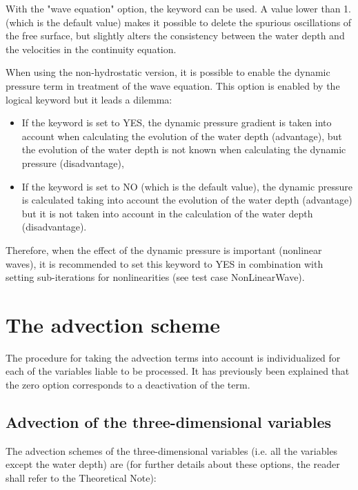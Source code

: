 With the "wave equation" option, the keyword  can be used. A value lower than 1. (which is the default value) makes
it possible to delete the spurious oscillations of the free surface, but
slightly alters the consistency between the water depth and the velocities in
the continuity equation.

When using the non-hydrostatic version, it is possible to enable the dynamic
pressure term in treatment of the wave equation. This option is enabled by the
logical keyword  but it leads a
dilemma:

\begin{itemize}
\item If the keyword is set to YES, the dynamic pressure gradient is taken
into account when calculating the evolution of the water depth (advantage), but
the evolution of the water depth is not known when calculating the dynamic
pressure (disadvantage),

\item If the keyword is set to NO (which is the default value), the dynamic
pressure is calculated taking into account the evolution of the water depth
(advantage) but it is not taken into account in the calculation of the water
depth (disadvantage).
\end{itemize}

Therefore, when the effect of the dynamic pressure is important (nonlinear
waves), it is recommended to set this keyword to YES in combination with
setting sub-iterations for nonlinearities (see test case NonLinearWave).


\section{The advection scheme}
\label{sec:advection}
The procedure for taking the advection terms into account is individualized
for each of the variables liable to be processed. It has previously been
explained that the zero option corresponds to a deactivation of the term.


\subsection{Advection of the three-dimensional variables}

The advection schemes of the three-dimensional variables (i.e.
all the variables except the water depth) are (for further details about these
options, the reader shall refer to the Theoretical Note):

